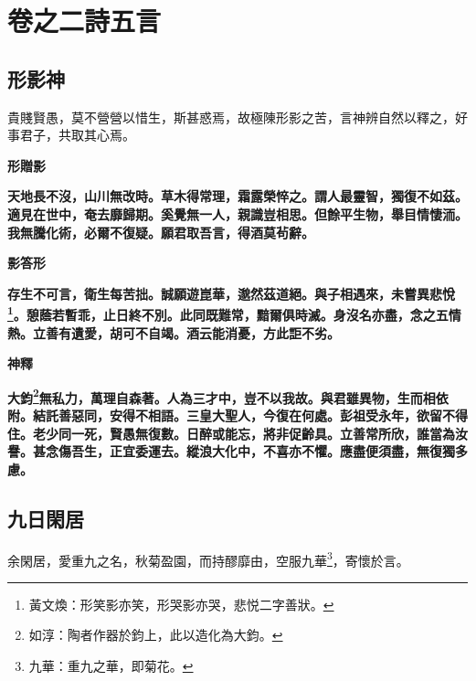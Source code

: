 \chapter{卷之二\hspace{1ex}詩五言}

\section{形影神\hspace{1ex}{\footnotesize 并序}}

\begin{quoting}貴賤賢愚，莫不營營以惜生，斯甚惑焉，故極陳形影之苦，言神辨自然以釋之，好事君子，共取其心焉。\end{quoting}

\begin{quoting}\textbf{形贈影}\end{quoting}

\textbf{天地長不沒，山川無改時。草木得常理，霜露榮悴之。謂人最靈智，獨復不如茲。適見在世中，奄去靡歸期。奚覺無一人，親識豈相思。但餘平生物，舉目情悽洏。我無騰化術，必爾不復疑。願君取吾言，得酒莫茍辭。}

\begin{quoting}\textbf{影答形}\end{quoting}

\textbf{存生不可言，衛生每苦拙。誠願遊崑華，邈然茲道絕。與子相遇來，未嘗異悲悅\footnote{黃文煥：形笑影亦笑，形哭影亦哭，悲悦二字善狀。}。憩蔭若暫乖，止日終不別。此同既難常，黯爾俱時滅。身沒名亦盡，念之五情熱。立善有遺愛，胡可不自竭。酒云能消憂，方此詎不劣。}

\begin{quoting}\textbf{神釋}\end{quoting}

\textbf{大鈞\footnote{如淳：陶者作器於鈞上，此以造化為大鈞。}無私力，萬理自森著。人為三才中，豈不以我故。與君雖異物，生而相依附。結託善惡同，安得不相語。三皇大聖人，今復在何處。彭祖受永年，欲留不得住。老少同一死，賢愚無復數。日醉或能忘，將非促齡具。立善常所欣，誰當為汝譽。甚念傷吾生，正宜委運去。縱浪大化中，不喜亦不懼。應盡便須盡，無復獨多慮。}

\section{九日閑居\hspace{1ex}{\footnotesize 并序}}

\begin{quoting}余閑居，愛重九之名，秋菊盈園，而持醪靡由，空服九華\footnote{九華：重九之華，即菊花。}，寄懷於言。\end{quoting}

